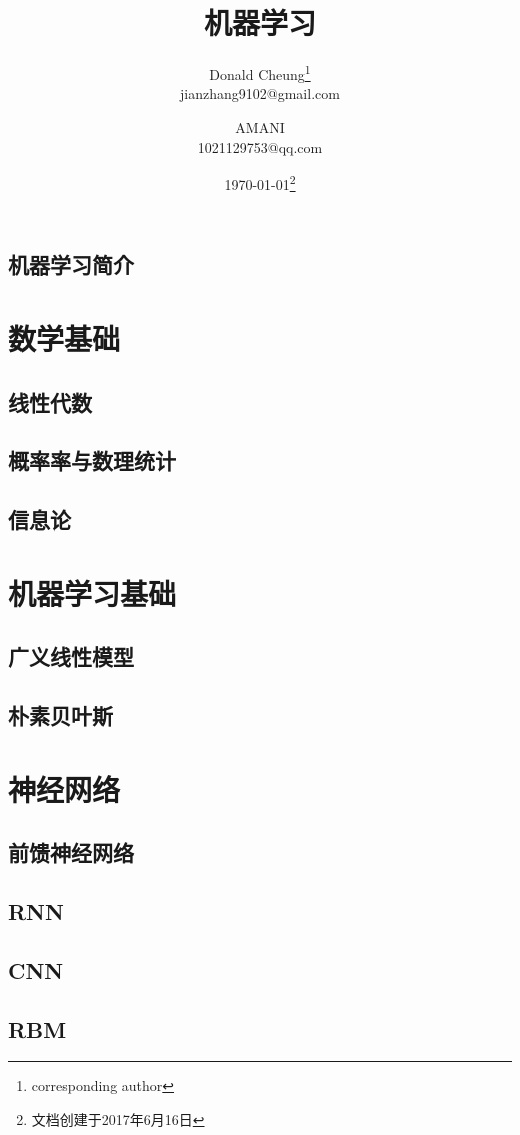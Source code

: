 \documentclass[UTF8,10pt,a4paper]{ctexbook}
\title{机器学习}
\author{Donald Cheung\thanks{corresponding author}\\jianzhang9102@gmail.com \and
        AMANI\\1021129753@qq.com}
\date{\today\footnote{文档创建于2017年6月16日}}
\begin{document}
\tableofcontents

\chapter{机器学习简介}

\part{数学基础}

\chapter{线性代数}
\chapter{概率率与数理统计}
\chapter{信息论}


\part{机器学习基础}
\chapter{广义线性模型}
\chapter{朴素贝叶斯}



\part{神经网络}
\chapter{前馈神经网络}
\chapter{RNN}
\chapter{CNN}
\chapter{RBM}

\end{document}
